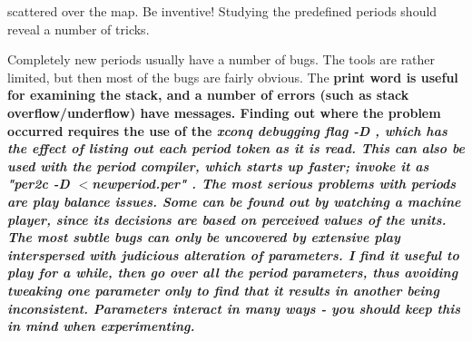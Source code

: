 scattered over the map.  Be inventive!
Studying the predefined periods should reveal a number of tricks.
\par\noindent
Completely new periods usually have a number of bugs.  The tools are
rather limited, but then most of the bugs are fairly obvious.
The %
\bf print \rm%
word is useful for examining the stack, and a number of
errors (such as stack overflow/underflow) have messages.  Finding out
where the problem occurred requires the use of the %
\it xconq \rm%
debugging
flag %
\bf -D\rm%
, which has the effect of listing out each period token as
it is read.  This can also be used with the period compiler, which starts
up faster; invoke it as %
\bf "per2c -D $<$newperiod.per"\rm%
.  The most serious
problems with periods are play balance issues.  Some can be found out by
watching a machine player, since its decisions are based on perceived values
of the units.  The most subtle bugs can only be uncovered by extensive play
interspersed with judicious alteration of parameters.  I find it useful to
play for a while, then go over all the period parameters, thus avoiding
tweaking one parameter only to find that it results in another being
inconsistent.  Parameters interact in many ways - you should keep this in
mind when experimenting.

